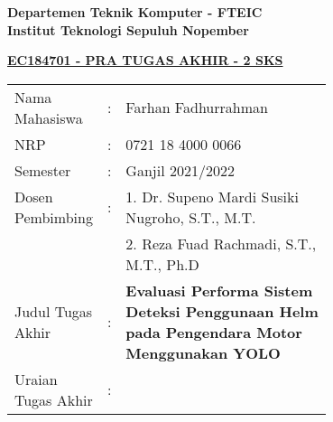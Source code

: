 \begin{flushleft}
  \textbf{Departemen Teknik Komputer - FTEIC}\\
  \textbf{Institut Teknologi Sepuluh Nopember}\\
\end{flushleft}

\begin{center}
  \underline{\textbf{EC184701  - PRA TUGAS AKHIR - 2 SKS}}
\end{center}

\begin{adjustwidth}{-0.2cm}{}
  \begin{tabular}{lcp{0.7\linewidth}}

    Nama Mahasiswa &:& Farhan Fadhurrahman \\
    NRP &:& 0721 18 4000 0066 \\

    Semester &:& Ganjil 2021/2022 \\

    Dosen Pembimbing &:& 1.  Dr. Supeno Mardi Susiki Nugroho, S.T., M.T. \\
    & & 2. Reza Fuad Rachmadi, S.T., M.T., Ph.D \\

    Judul Tugas Akhir &:& \textbf{Evaluasi Performa Sistem Deteksi Penggunaan Helm pada Pengendara Motor Menggunakan YOLO}\\

    Uraian Tugas Akhir &:& \\
  \end{tabular}
\end{adjustwidth}

